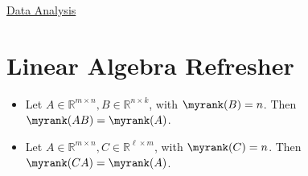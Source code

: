 \documentclass{article}
\begin{document}
\begin{center}
{\huge \underline{Data Analysis}}
\end{center}

\section*{Linear Algebra Refresher}
\begin{theorem} \hphantom{}
  \begin{itemize}
  \item Let $A \in \mathbb{R}^{m \times  n}, B  \in \mathbb{R}^{n \times  k}$, with $\myrank(B) = n$. Then $\myrank(AB) = \myrank(A)$. 
  \item Let $A \in \mathbb{R}^{m \times  n}, C \in \mathbb{R}^{\ell \times  m}$, with $\myrank(C) = n$. Then $\myrank(CA) = \myrank(A)$.  
\end{itemize}
\end{theorem}
\end{document}
